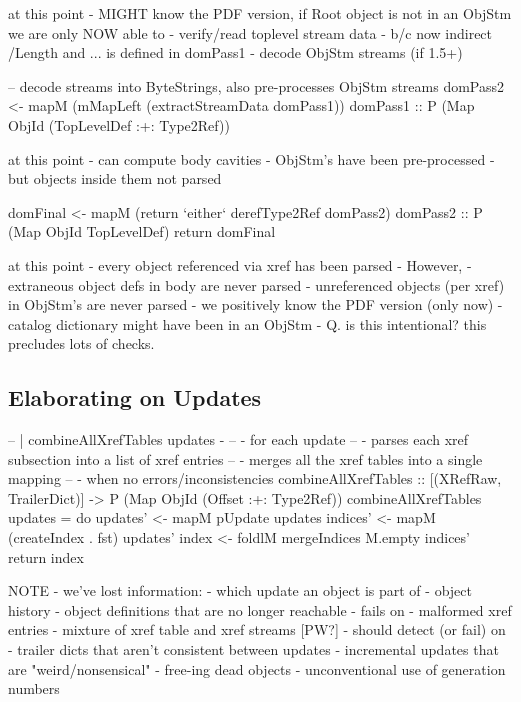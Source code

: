 at this point
  - MIGHT know the PDF version, if Root object is not in an ObjStm
we are only NOW able to
  - verify/read toplevel stream data
    - b/c now indirect /Length and ... is defined in domPass1
    - decode ObjStm streams (if 1.5+)
    
\begin{code}
  -- decode streams into ByteStrings, also pre-processes ObjStm streams
  domPass2 <- mapM
                (mMapLeft (extractStreamData domPass1))
                domPass1
              :: P (Map ObjId (TopLevelDef :+: Type2Ref))
\end{code}

at this point
 - can compute body cavities
 - ObjStm's have been pre-processed
   - but objects inside them not parsed

\begin{code}
  domFinal <- mapM
               (return `either` derefType2Ref domPass2)
                domPass2
              :: P (Map ObjId TopLevelDef)
  return domFinal
\end{code}

at this point
 - every object referenced via xref has been parsed
 - However,
   - extraneous object defs in body are never parsed
   - unreferenced objects (per xref) in ObjStm's are never parsed
 - we positively know the PDF version (only now)
   - catalog dictionary might have been in an ObjStm
   - Q. is this intentional? this precludes lots of checks.

\subsection{Elaborating on Updates}
   
\begin{code}
-- | combineAllXrefTables updates - 
--   - for each update
--     - parses each xref subsection into a list of xref entries
--   - merges all the xref tables into a single mapping
--     - when no errors/inconsistencies
combineAllXrefTables
  :: [(XRefRaw, TrailerDict)] -> P (Map ObjId (Offset :+: Type2Ref))
combineAllXrefTables updates =
  do
  updates' <- mapM pUpdate updates  
  indices' <- mapM (createIndex . fst) updates' 
  index    <- foldlM mergeIndices M.empty indices'
  return index
\end{code}

NOTE
 - we've lost information:
   - which update an object is part of
   - object history
   - object definitions that are no longer reachable
 - fails on
   - malformed xref entries
   - mixture of xref table and xref streams [PW?]
 - should detect (or fail) on
   - trailer dicts that aren't consistent between updates
   - incremental updates that are "weird/nonsensical"
     - free-ing dead objects
     - unconventional use of generation numbers
         
